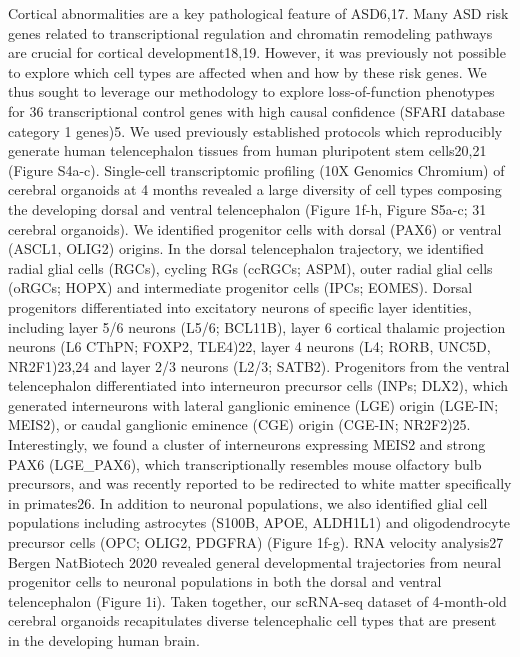 Cortical abnormalities are a key pathological feature of ASD6,17. Many ASD risk genes related to transcriptional regulation and chromatin remodeling pathways are crucial for cortical development18,19. However, it was previously not possible to explore which cell types are affected when and how by these risk genes. We thus sought to leverage our methodology to explore loss-of-function phenotypes for 36 transcriptional control genes with high causal confidence (SFARI database category 1 genes)5.
We used previously established protocols which reproducibly generate human telencephalon tissues from human pluripotent stem cells20,21 (Figure S4a-c). Single-cell transcriptomic profiling (10X Genomics Chromium) of cerebral organoids at 4 months revealed a large diversity of cell types composing the developing dorsal and ventral telencephalon (Figure 1f-h, Figure S5a-c; 31 cerebral organoids). We identified progenitor cells with dorsal (PAX6) or ventral (ASCL1, OLIG2) origins. In the dorsal telencephalon trajectory, we identified radial glial cells (RGCs), cycling RGs (ccRGCs; ASPM), outer radial glial cells (oRGCs; HOPX) and intermediate progenitor cells (IPCs; EOMES). Dorsal progenitors differentiated into excitatory neurons of specific layer identities, including layer 5/6 neurons (L5/6; BCL11B), layer 6 cortical thalamic projection neurons (L6 CThPN; FOXP2, TLE4)22,  layer 4 neurons (L4; RORB, UNC5D, NR2F1)23,24 and layer 2/3 neurons (L2/3; SATB2). Progenitors from the ventral telencephalon differentiated into interneuron precursor cells (INPs; DLX2), which generated interneurons with lateral ganglionic eminence (LGE) origin (LGE-IN; MEIS2), or caudal ganglionic eminence (CGE) origin (CGE-IN; NR2F2)25. Interestingly, we found a cluster of interneurons expressing MEIS2 and strong PAX6 (LGE\_PAX6), which transcriptionally resembles mouse olfactory bulb precursors, and was recently reported to be redirected to white matter specifically in primates26. In addition to neuronal populations, we also identified glial cell populations including astrocytes (S100B, APOE, ALDH1L1) and oligodendrocyte precursor cells (OPC; OLIG2, PDGFRA) (Figure 1f-g). RNA velocity analysis27 {Bergen NatBiotech 2020} revealed general developmental trajectories from neural progenitor cells to neuronal populations in both the dorsal and ventral telencephalon (Figure 1i). Taken together, our scRNA-seq dataset of 4-month-old cerebral organoids recapitulates diverse telencephalic cell types that are present in the developing human brain. 

